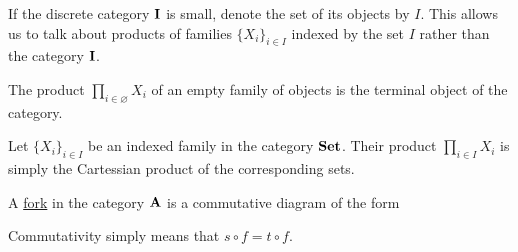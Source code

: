 \begin{note}\label{note:small_categorical_product}
  If the discrete category $\operatorname{\mathbf{I}}$ is small, denote the set of its objects by $I$. This allows us to talk about products of families $\{ X_i \}_{i \in I}$ indexed by the set $I$ rather than the category $\operatorname{\mathbf{I}}$.
\end{note}

\begin{note}\label{note:categorical_product_of_empty_family}
  The product $\prod_{i \in \varnothing} X_i$ of an empty family of objects is the terminal object of the category.
\end{note}

\begin{example}\label{ex:categorical_product/set}
  Let $\{ X_i \}_{i \in I}$ be an indexed family in the category $\operatorname{\mathbf{Set}}$. Their product $\prod_{i \in I} X_i$ is simply the Cartessian product of the corresponding sets.
\end{example}

\begin{definition}\label{def:categorical_fork}\cite[112]{Leinster2014}
  A \uline{fork} in the category $\operatorname{\mathbf{A}}$ is a commutative diagram of the form
  \begin{center}
  \end{center}

  Commutativity simply means that $s \circ f = t \circ f$.
\end{definition}


